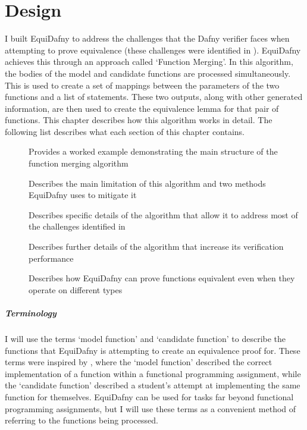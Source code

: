 \chapter{Design}\label{chp:design}

I built EquiDafny to address the challenges that the Dafny verifier faces when attempting to prove equivalence (these challenges were identified in ). EquiDafny achieves this through an approach called `Function Merging'. In this algorithm, the bodies of the model and candidate functions are processed simultaneously. This is used to create a set of mappings between the parameters of the two functions and a list of statements. These two outputs, along with other generated information, are then used to create the equivalence lemma for that pair of functions. This chapter describes how this algorithm works in detail. The following list describes what each section of this chapter contains.

\begin{description}
   \item[] Provides a worked example demonstrating the main structure of the function merging algorithm 
   \item[] Describes the main limitation of this algorithm and two methods EquiDafny uses to mitigate it
   \item[] Describes specific details of the algorithm that allow it to address most of the challenges identified in 
   \item[] Describes further details of the algorithm that increase its verification performance
   \item[] Describes how EquiDafny can prove functions equivalent even when they operate on different types
\end{description}

\paragraph{Terminology} I will use the terms `model function' and `candidate function' to describe the functions that EquiDafny is attempting to create an equivalence proof for. These terms were inspired by \textcite{milovancevicProvingDisprovingEquivalence2023}, where the `model function' described the correct implementation of a function within a functional programming assignment, while the `candidate function' described a student's attempt at implementing the same function for themselves. EquiDafny can be used for tasks far beyond functional programming assignments, but I will use these terms as a convenient method of referring to the functions being processed. 

